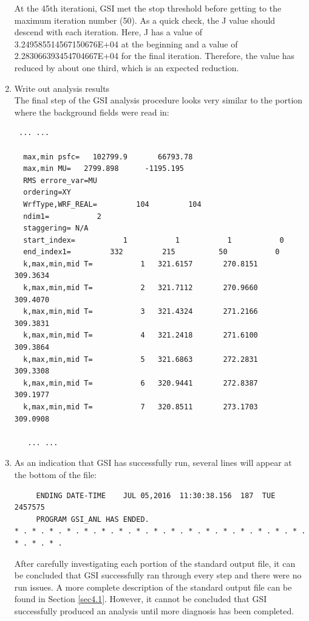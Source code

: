 \begin{enumerate}
At the 45th iterationi, GSI met the stop threshold before getting to the maximum iteration number (50).  As a quick check, the J value should descend with each iteration.  Here, J has a value of 3.249585514567150676E+04 at the beginning and a value of 2.283066393454704667E+04 for the final iteration.  Therefore, the value has reduced by about one third, which is an expected reduction.\\

\item Write out analysis results\\

The final step of the GSI analysis procedure looks very similar to the portion where the background fields were read in:

\begin{scriptsize}
\begin{verbatim}
 ... ...

  max,min psfc=   102799.9       66793.78
  max,min MU=   2799.898      -1195.195
  RMS errore_var=MU
  ordering=XY
  WrfType,WRF_REAL=         104         104
  ndim1=           2
  staggering= N/A
  start_index=           1           1           1           0
  end_index1=         332         215          50           0
  k,max,min,mid T=           1   321.6157       270.8151       309.3634
  k,max,min,mid T=           2   321.7112       270.9660       309.4070
  k,max,min,mid T=           3   321.4324       271.2166       309.3831
  k,max,min,mid T=           4   321.2418       271.6100       309.3864
  k,max,min,mid T=           5   321.6863       272.2831       309.3308
  k,max,min,mid T=           6   320.9441       272.8387       309.1977
  k,max,min,mid T=           7   320.8511       273.1703       309.0908

   ... ...
\end{verbatim}
\end{scriptsize}

\item As an indication that GSI has successfully run, several lines will appear at the bottom of the file:

\begin{scriptsize}
\begin{verbatim}
     ENDING DATE-TIME    JUL 05,2016  11:30:38.156  187  TUE   2457575
     PROGRAM GSI_ANL HAS ENDED.
* . * . * . * . * . * . * . * . * . * . * . * . * . * . * . * . * . * . * . * .
\end{verbatim}
\end{scriptsize}

After carefully investigating each portion of the standard output file, it can be concluded that GSI successfully ran through every step and there were no run issues. A more complete description of the standard output file can be found in Section \ref{sec4.1}. However, it cannot be concluded that GSI successfully produced an analysis until more diagnosis has been completed.

\end{enumerate}

